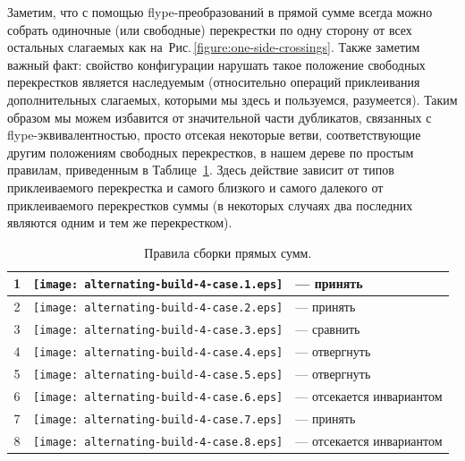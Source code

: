 \documentclass[12pt]{article}
\theoremstyle{plain}
\theoremstyle{definition}
\def\figureref#1{Рис.\,\protect\ref{#1}}
\begin{document}
		Заметим, что с помощью flype-преобразований в прямой сумме всегда можно собрать одиночные (или свободные) перекрестки по одну
		сторону от всех остальных слагаемых как на~\figureref{figure:one-side-crossings}. Также заметим важный факт: свойство конфигурации
		нарушать такое положение свободных перекрестков является наследуемым (относительно операций приклеивания дополнительных
		слагаемых, которыми мы здесь и пользуемся, разумеется). Таким образом мы можем избавится от значительной части дубликатов,
		связанных с flype-эквивалентностью, просто отсекая некоторые ветви, соответствующие другим положениям свободных перекрестков,
		в нашем дереве по простым правилам, приведенным в Таблице~\ref{table:sums-rules}. Здесь действие зависит от типов
		приклеиваемого перекрестка и самого близкого и самого далекого от приклеиваемого перекрестков суммы (в некоторых случаях два
		последних являются одним и тем же перекрестком).

		\begin{table}[ht]
			\caption{Правила сборки прямых сумм.\label{table:sums-rules}}
			\centering
			\begin{tabular}{cm{26mm}l}
				\hline\hline
				1 & \texttt{[image: alternating-build-4-case.1.eps]} & --- принять \\
				\hline
				2 & \texttt{[image: alternating-build-4-case.2.eps]} & --- принять \\
				\hline
				3 & \texttt{[image: alternating-build-4-case.3.eps]} & --- сравнить \\
				\hline
				4 & \texttt{[image: alternating-build-4-case.4.eps]} & --- отвергнуть \\
				\hline
				5 & \texttt{[image: alternating-build-4-case.5.eps]} & --- отвергнуть \\
				\hline
				6 & \texttt{[image: alternating-build-4-case.6.eps]} & --- отсекается инвариантом \\
				\hline
				7 & \texttt{[image: alternating-build-4-case.7.eps]} & --- принять \\
				\hline
				8 & \texttt{[image: alternating-build-4-case.8.eps]} & --- отсекается инвариантом \\
				\hline\hline
			\end{tabular}
		\end{table}
\end{document}

